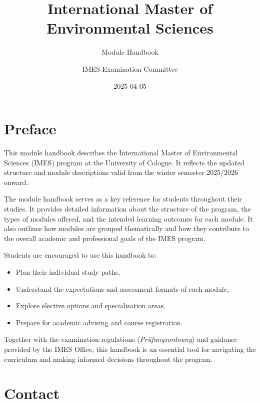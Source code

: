 \documentclass[
  letterpaper,
  10pt,
  openany]{book}
\title{International Master of Environmental Sciences}
\subtitle{Module Handbook}
\author{IMES Examination Committee}
\date{2025-04-05}
\providecommand{\tightlist}{%
  \setlength{\itemsep}{0pt}\setlength{\parskip}{0pt}}\usepackage{longtable,booktabs,array}
\renewcommand*\contentsname{Table of contents}
\newcommand\contentsname{Table of contents}
\begin{document}
\frontmatter
\maketitle

\renewcommand*\contentsname{Table of contents}
{
\setcounter{tocdepth}{0}
\tableofcontents
}

\mainmatter
{}

\chapter*{Preface}\label{preface}


This module handbook describes the International Master of Environmental
Sciences (IMES) program at the University of Cologne. It reflects the
updated structure and module descriptions valid from the winter semester
2025/2026 onward.

The module handbook serves as a key reference for students throughout
their studies. It provides detailed information about the structure of
the program, the types of modules offered, and the intended learning
outcomes for each module. It also outlines how modules are grouped
thematically and how they contribute to the overall academic and
professional goals of the IMES program.

Students are encouraged to use this handbook to:

\begin{itemize}
\tightlist
\item
  Plan their individual study paths,
\item
  Understand the expectations and assessment formats of each module,
\item
  Explore elective options and specialisation areas,
\item
  Prepare for academic advising and course registration.
\end{itemize}

Together with the examination regulations (\emph{Prüfungsordnung}) and
guidance provided by the IMES Office, this handbook is an essential tool
for navigating the curriculum and making informed decisions throughout
the program.


\chapter*{Contact}\label{contact}
\end{document}
